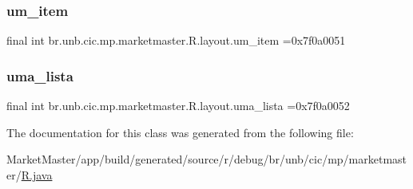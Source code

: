 \subsubsection{\texorpdfstring{um\+\_\+item}{um\_item}}
{\footnotesize\ttfamily final int br.\+unb.\+cic.\+mp.\+marketmaster.\+R.\+layout.\+um\+\_\+item =0x7f0a0051\hspace{0.3cm}{\ttfamily [static]}}

\mbox{\label{classbr_1_1unb_1_1cic_1_1mp_1_1marketmaster_1_1R_1_1layout_ac184cd4c6a865b6bb98bbc9eb0930937}} 
\subsubsection{\texorpdfstring{uma\+\_\+lista}{uma\_lista}}
{\footnotesize\ttfamily final int br.\+unb.\+cic.\+mp.\+marketmaster.\+R.\+layout.\+uma\+\_\+lista =0x7f0a0052\hspace{0.3cm}{\ttfamily [static]}}



The documentation for this class was generated from the following file\+:\begin{DoxyCompactItemize}
\item 
Market\+Master/app/build/generated/source/r/debug/br/unb/cic/mp/marketmaster/\mbox{\hyperlink{debug_2br_2unb_2cic_2mp_2marketmaster_2R_8java}{R.\+java}}\end{DoxyCompactItemize}
